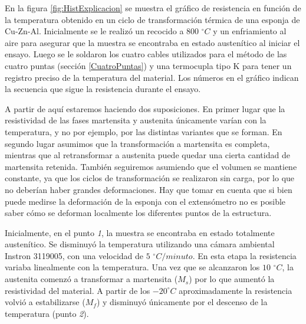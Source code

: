 \documentclass[a4paper,12pt,fleqn,twoside,openany]{book}
\begin{document}
 
 En la figura \ref{fig:HistExplicacion} se muestra el gráfico de resistencia en función de la temperatura obtenido en un ciclo de transformación térmica de una esponja de Cu-Zn-Al. Inicialmente se le realizó un recocido a 800 $^\circ C$ y un enfriamiento al aire para asegurar que la muestra se encontraba en estado austenítico al iniciar el ensayo. Luego se le soldaron los cuatro cables utilizados para el método de las cuatro puntas (sección \ref{CuatroPuntas}) y una termocupla tipo K para tener un registro preciso de la temperatura del material. Los números en el gráfico indican la secuencia que sigue la resistencia durante el ensayo. 
 
 A partir de aquí estaremos haciendo dos suposiciones. En primer lugar que la resistividad de las fases martensita y austenita únicamente varían con la temperatura, y no por ejemplo, por las distintas variantes que se forman. En segundo lugar asumimos que la transformación a martensita es completa, mientras que al retransformar a austenita puede quedar una cierta cantidad de martensita retenida. También seguiremos asumiendo que el volumen se mantiene constante, ya que los ciclos de transformación se realizaron sin carga, por lo que no deberían haber grandes deformaciones. Hay que tomar en cuenta que si bien puede medirse la deformación de la esponja con el extensómetro no es posible saber cómo se deforman localmente los diferentes puntos de la estructura.
 
 
 Inicialmente, en el punto \textit{1}, la muestra se encontraba en estado totalmente austenítico. Se disminuyó la temperatura utilizando una cámara ambiental Instron 3119005, con una velocidad de $5$ $^\circ C/minuto$. En esta etapa la resistencia variaba linealmente con la temperatura.
 Una vez que se alcanzaron los $10$ $^\circ C$, la austenita comenzó a transformar a martensita ($M_s$) por lo que aumentó la resistividad del material. A partir de los $-20^\circ C$ aproximadamente la resistencia volvió a estabilizarse ($M_f$) y disminuyó únicamente por el descenso de la temperatura (punto \textit{2}).     
 
\end{document}
